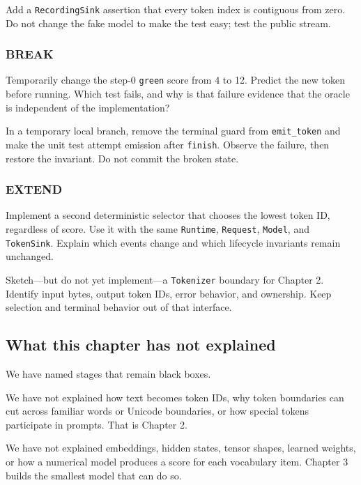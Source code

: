 \documentclass[
  10pt,
]{article}
\begin{document}
Add a \texttt{RecordingSink} assertion that every token index is
contiguous from zero. Do not change the fake model to make the test
easy; test the public stream.

\subsubsection{BREAK}\label{break}

Temporarily change the step-0 \texttt{green} score from 4 to 12. Predict
the new token before running. Which test fails, and why is that failure
evidence that the oracle is independent of the implementation?

In a temporary local branch, remove the terminal guard from
\texttt{emit\_token} and make the unit test attempt emission after
\texttt{finish}. Observe the failure, then restore the invariant. Do not
commit the broken state.

\subsubsection{EXTEND}\label{extend}

Implement a second deterministic selector that chooses the lowest token
ID, regardless of score. Use it with the same \texttt{Runtime},
\texttt{Request}, \texttt{Model}, and \texttt{TokenSink}. Explain which
events change and which lifecycle invariants remain unchanged.

Sketch---but do not yet implement---a \texttt{Tokenizer} boundary for
Chapter 2. Identify input bytes, output token IDs, error behavior, and
ownership. Keep selection and terminal behavior out of that interface.

\subsection{What this chapter has not
explained}\label{what-this-chapter-has-not-explained}

We have named stages that remain black boxes.

We have not explained how text becomes token IDs, why token boundaries
can cut across familiar words or Unicode boundaries, or how special
tokens participate in prompts. That is Chapter 2.

We have not explained embeddings, hidden states, tensor shapes, learned
weights, or how a numerical model produces a score for each vocabulary
item. Chapter 3 builds the smallest model that can do so.
\end{document}
